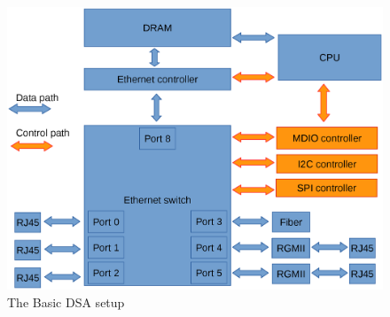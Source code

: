 \documentclass[letterpaper]{article}
\begin{document}
\begin{figure}[ht]
  \centering
  \includegraphics[width=\columnwidth]{DSA-basic.eps}
  \caption{The Basic DSA setup}
  \label{dsa-basic}
\end{figure}
\end{document}
